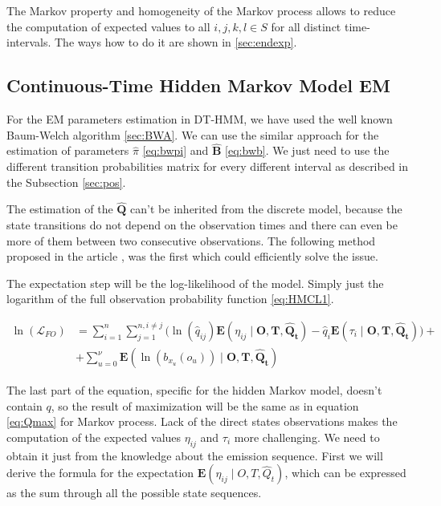 \documentclass[thesis=M,english]{FITthesis}[2012/10/20]
\newcommand{\matr}[1]{\mathbf{#1}}
\begin{document}
The Markov property and homogeneity of the Markov process allows to reduce the computation of expected values to all $i,j,k,l \in S$ for all distinct time-intervals. The ways how to do it are shown in \ref{sec:endexp}.     
   
\subsection{Continuous-Time Hidden Markov Model EM}

For the EM parameters estimation in DT-HMM, we have used the well known Baum-Welch algorithm \ref{sec:BWA}. We can use the similar approach for the estimation of parameters $\hat \pi$ \eqref{eq:bwpi} and $\matr{ \hat B }$ \eqref{eq:bwb}. We just need to use the different transition probabilities matrix for every different interval as described in the Subsection \ref{sec:pos}.  

The estimation of the $\matr{ \hat Q }$ can't be inherited from the discrete model, because the state transitions do not depend on the observation times and there can even be more of them between two consecutive observations. The following method proposed in the article \cite{Li15}, was the first which could efficiently solve the issue.        

The expectation step will be the log-likelihood of the model. Simply just the logarithm of the full observation probability function \eqref{eq:HMCL1}.

\begin{equation}\label{eq:EMCTHMM}
\begin{aligned}  
 \ln(\mathcal{L}_{FO}) &= \sum_{i=1}^{n} \sum_{j=1}^{n, i \neq j} \big( \ln( \hat q_{ij}) \mathbf{E}( \eta_{ij} \mid \matr{O},\matr{T}, \matr{ \hat Q_t } ) - \hat q_i \mathbf{E}( \tau_i \mid \matr{O},\matr{T}, \matr{ \hat Q_t } ) \big) + \\
    &+ \sum_{u=0}^{\nu} \mathbf{E}( \ln( b_{ x_u }(o_u) ) \mid \matr{O},\matr{T},\matr{\hat Q_t} )
\end{aligned}
\end{equation}

The last part of the equation, specific for the hidden Markov model, doesn't contain $q$, so the result of maximization will be the same as in equation \eqref{eq:Qmax} for Markov process. Lack of the direct states observations makes the computation of the expected values $\eta_{ij}$ and $\tau_i$ more challenging. We need to obtain it just from the knowledge about the emission sequence. First we will derive the formula for the expectation $\mathbf{E}(\eta_{ij} \mid O,T, \hat Q_t )$, which can be expressed as the sum through all the possible state sequences.
\end{document}
